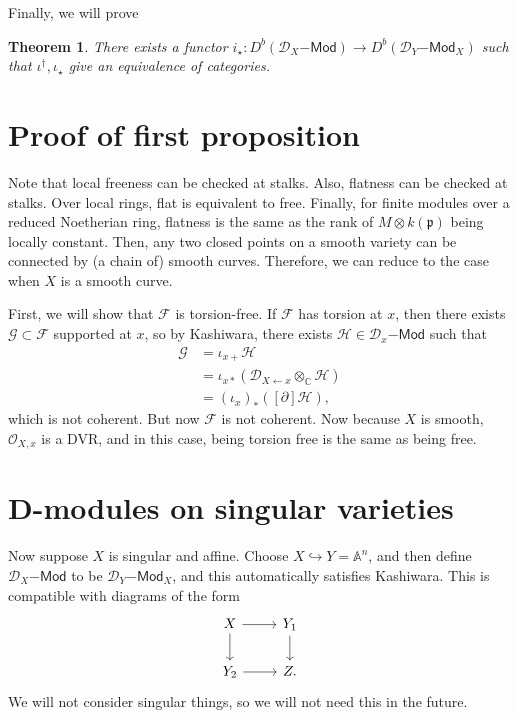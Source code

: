\documentclass[leqno, openany]{memoir}
\newtheorem{thm}{Theorem}[section]
\theoremstyle{definition}
\theoremstyle{remark}
\theoremstyle{plain}
\theoremstyle{definition}
\theoremstyle{remark}
\newcommand{\A}{\mathbb{A}}
\newcommand{\C}{\mathbb{C}}
\newcommand{\mc}[1]{\mathcal{#1}}
\newcommand{\mf}[1]{\mathfrak{#1}}
\newcommand{\ms}[1]{\mathsf{#1}}
\begin{document}
Finally, we will prove
\begin{thm}
    There exists a functor $i_{\star} \colon D^b(\mc{D}_X\ms{-Mod}) \to D^b (\mc{D}_Y\ms{-Mod}_X)$ such that $\iota^{\dagger}, \iota_{\star}$ give an equivalence of categories.
\end{thm}

\section{Proof of first proposition}

Note that local freeness can be checked at stalks. Also, flatness can be checked at stalks. Over local rings, flat is equivalent to free. Finally, for finite modules over a reduced Noetherian ring, flatness is the same as the rank of $M \otimes k(\mf{p})$ being locally constant. Then, any two closed points on a smooth variety can be connected by (a chain of) smooth curves. Therefore, we can reduce to the case when $X$ is a smooth curve.

First, we will show that $\mc{F}$ is torsion-free. If $\mc{F}$ has torsion at $x$, then there exists $\mc{G} \subset \mc{F}$ supported at $x$, so by Kashiwara, there exists $\mc{H} \in \mc{D}_{x}\ms{-Mod}$ such that
\begin{align*}
    \mc{G} &= \iota_{x+} \mc{H} \\
    &= \iota_{x*} (\mc{D}_{X \gets x} \otimes_{\C} \mc{H}) \\
    &= (\iota_x)_* ([\partial] \mc{H}),
\end{align*}
which is not coherent. But now $\mc{F}$ is not coherent. Now because $X$ is smooth, $\mc{O}_{X,x}$ is a DVR, and in this case, being torsion free is the same as being free.

\section{D-modules on singular varieties}

Now suppose $X$ is singular and affine. Choose $X \hookrightarrow Y = \A^n$, and then define $\mc{D}_X\ms{-Mod}$ to be $\mc{D}_Y\ms{-Mod}_X$, and this automatically satisfies Kashiwara. This is compatible with diagrams of the form
\begin{equation*}
\begin{tikzcd}
        X \ar{r} \ar{d} & Y_1 \ar{d} \\
        Y_2 \ar{r} & Z.
\end{tikzcd}
\end{equation*}
We will not consider singular things, so we will not need this in the future.
\end{document}
